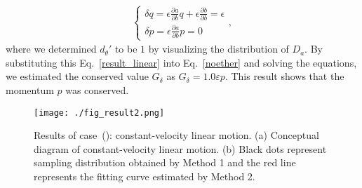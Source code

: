 \documentclass[preprint,
bibnotes,
 amsmath,amssymb,
 aps,
]{revtex4-1}
\newcounter{num}
\newcommand{\rnum}[1]{\setcounter{num}{#1}\roman{num}}
\begin{document}
\begin{eqnarray}
  \begin{cases}
  \label{result_linear}
\delta q = \epsilon \frac{\partial a}{\partial b} q + \epsilon \frac{\partial b}{\partial b} = \epsilon\\ 
\delta p = \epsilon \frac{\partial a}{\partial b} p = 0 
  \end{cases},
\end{eqnarray}
where we determined $d_{\theta}'$ to be $1$ by visualizing the distribution of $D_a$. 
By substituting this Eq.~\eqref{result_linear} into Eq.~\eqref{noether} and solving the equations, we estimated the conserved value $G_{\delta}$ as $G_{\delta} = 1.0\varepsilon p$. 
This result shows that the momentum $p$ was conserved. 

\begin{figure}[t]
  \begin{center}
   \texttt{[image: ./fig\_result2.png]}
  \caption{Results of case~(\rnum{2}): constant-velocity linear motion. (a) Conceptual diagram of constant-velocity linear motion. 
(b) Black dots represent sampling distribution obtained by Method 1 and the red line represents the fitting curve estimated by Method 2.}
  \label{fig_result2}
  \end{center}
\end{figure}
\end{document}
